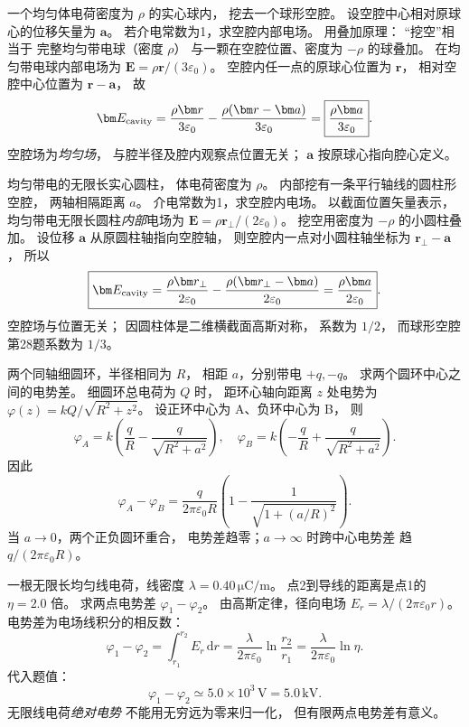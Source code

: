 一个均匀体电荷密度为 $\rho$ 的实心球内，
挖去一个球形空腔。
设空腔中心相对原球心的位移矢量为 $\bm a$。
若介电常数为1，求空腔内部电场。
\exsolution
用叠加原理：
“挖空”相当于
完整均匀带电球（密度 $\rho$）
与一颗在空腔位置、密度为 $-\rho$ 的球叠加。
在均匀带电球内部电场为
$\bm E=\rho\bm r/(3\varepsilon_0)$。
空腔内任一点的原球心位置为 $\bm r$，
相对空腔中心位置为 $\bm r-\bm a$，
故
\[
\bm E_{\rm cavity}
=\frac{\rho\bm r}{3\varepsilon_0}
-\frac{\rho(\bm r-\bm a)}{3\varepsilon_0}
=\boxed{\frac{\rho\bm a}{3\varepsilon_0}}.
\]
\excheck 空腔场为\emph{均匀场}，
与腔半径及腔内观察点位置无关；
$\bm a$ 按原球心指向腔心定义。

均匀带电的无限长实心圆柱，
体电荷密度为 $\rho$。
内部挖有一条平行轴线的圆柱形空腔，
两轴相隔距离 $a$。
介电常数为1，求空腔内电场。
\exsolution
以截面位置矢量表示，
均匀带电无限长圆柱\emph{内部}电场为
$\bm E=\rho\bm r_\perp/(2\varepsilon_0)$。
挖空用密度为 $-\rho$ 的小圆柱叠加。
设位移 $\bm a$ 从原圆柱轴指向空腔轴，
则空腔内一点对小圆柱轴坐标为
$\bm r_\perp-\bm a$，
所以
\[
\boxed{\bm E_{\rm cavity}=
\frac{\rho\bm r_\perp}{2\varepsilon_0}
-\frac{\rho(\bm r_\perp-\bm a)}{2\varepsilon_0}
=\frac{\rho\bm a}{2\varepsilon_0}}.
\]
\excheck 空腔场与位置无关；
因圆柱体是二维横截面高斯对称，
系数为 $1/2$，
而球形空腔第28题系数为 $1/3$。

两个同轴细圆环，半径相同为 $R$，
相距 $a$，分别带电 $+q,-q$。
求两个圆环中心之间的电势差。
\exsolution
细圆环总电荷为 $Q$ 时，
距环心轴向距离 $z$ 处电势为
$\varphi(z)=kQ/\sqrt{R^2+z^2}$。
设正环中心为 A、负环中心为 B，
则
\[
\varphi_A=k\left(\frac qR-\frac q{\sqrt{R^2+a^2}}\right),
\quad
\varphi_B=k\left(-\frac qR+\frac q{\sqrt{R^2+a^2}}\right).
\]
因此
\[
\boxed{\varphi_A-\varphi_B=
\frac q{2\pi\varepsilon_0R}
\left(1-\frac1{\sqrt{1+(a/R)^2}}\right)}.
\]
\excheck 当 $a\to0$，两个正负圆环重合，
电势差趋零；$a\to\infty$ 时跨中心电势差
趋 $q/(2\pi\varepsilon_0R)$。

一根无限长均匀线电荷，线密度
$\lambda=0.40\,\mathrm{\mu C/m}$。
点2到导线的距离是点1的 $\eta=2.0$ 倍。
求两点电势差 $\varphi_1-\varphi_2$。
\exsolution
由高斯定律，径向电场
$E_r=\lambda/(2\pi\varepsilon_0r)$。
电势差为电场线积分的相反数：
\[
\varphi_1-\varphi_2=
\int_{r_1}^{r_2}E_r\,\mathrm dr
=\frac{\lambda}{2\pi\varepsilon_0}
\ln\frac{r_2}{r_1}
=\frac{\lambda}{2\pi\varepsilon_0}\ln\eta.
\]
代入题值：
\[
\boxed{\varphi_1-\varphi_2\simeq
5.0\times10^3\,\mathrm V=5.0\,\mathrm{kV}}.
\]
\excheck 无限线电荷\emph{绝对电势}
不能用无穷远为零来归一化，
但有限两点电势差有意义。

